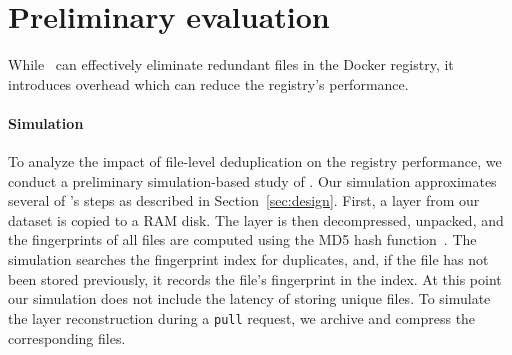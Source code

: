 \section{Preliminary evaluation}

While \sysname\ can effectively eliminate redundant files in the
Docker registry, it introduces overhead which can reduce the
registry's performance.
%



\paragraph{Simulation}
%
To analyze the impact of file-level deduplication on the registry performance,
we conduct a preliminary simulation-based study of \sysname.
%
%
%
%
%
Our simulation
approximates several of \sysname's steps as described in Section~\ref{sec:design}.
%
First, a layer from our dataset is copied to a RAM disk. 
%
%
%
The layer is then decompressed, unpacked, and the fingerprints of all files
are computed using the MD5 hash function~\cite{MD5}.
%
The simulation searches the fingerprint index for duplicates,
and, if the file has not been stored previously, it records the
file's fingerprint in the index.
%
%
%
%
%
At this point our simulation does not include
the latency of storing unique files.
%
To simulate the layer reconstruction during a \texttt{pull} request,
we archive and compress the corresponding files.
%
%

